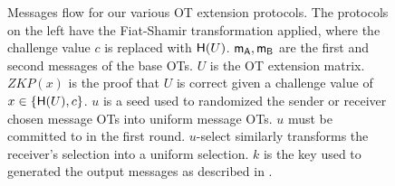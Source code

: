 \begin{figure}
{
}

\caption{Messages flow for our various OT extension protocols. The protocols on the left have the Fiat-Shamir transformation applied, where the challenge value $c$ is replaced with $\mathsf{H}(U)$. $\mathsf{m}_\mathsf{A},\mathsf{m}_\mathsf{B}$ are the first and second messages of the base OTs. $U$ is the OT extension matrix. $ZKP(x)$ is the proof that $U$ is correct given a challenge value of $x\in\{\mathsf{H}(U),c\}$. $u$ is a seed used to randomized the sender or receiver chosen message OTs into uniform message OTs. $u$ must be committed to in the first round. $u$-select similarly transforms the receiver's selection into a uniform selection.  $k$ is the key used to generated the output messages as described in . \label{fig:OTDataflow}}
\end{figure}
